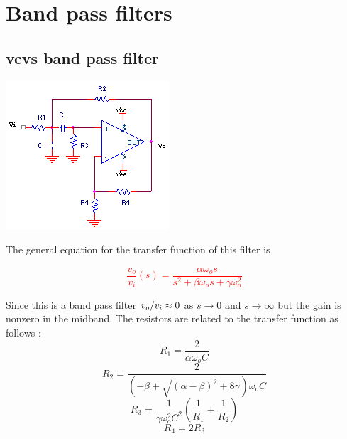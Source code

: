 \section{Band pass filters}

\subsection{\acs{vcvs} band pass filter}
\begin{center}
	\includegraphics{schematics/vcvs_bandpass.PNG}
\end{center}
The general equation for the transfer function of this filter is

\textcolor{red}{
\begin{equation}
\frac{v_{o}}{v_{i}}(s) = \frac{\alpha \omega_{o}s}{s^{2}+\beta \omega_{o}s + \gamma \omega_{o}^{2}}
\label{eq:vcvs_bandpass}
\end{equation}
}

Since this is a band pass filter $\vout/\vin \approx 0$ as $s \to 0$ and $s \to \infty$ but the gain is nonzero in the midband.
The resistors are related to the transfer function as follows \autocite[138-139]{op-amp-circuits-johnson}:
\begin{equation}
R_1 = \frac{2}{\alpha \omega_{o}C}
\end{equation}
\begin{equation}
R_2 = \frac{2}{(-\beta+\sqrt{(\alpha - \beta)^2 + 8\gamma})\omega_{o}C}
\end{equation}
\begin{equation}
R_3 = \frac{1}{\gamma \omega_{o}^2 C^2}\left(\frac{1}{R_1} + \frac{1}{R_2}\right)
\end{equation}
\begin{equation}
R_4 = 2R_3
\end{equation}

